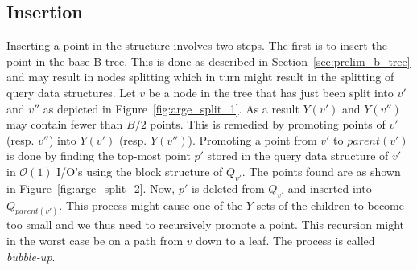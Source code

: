 \documentclass[twoside,11pt,openright]{report}
\begin{document}
\subsection{Insertion}
Inserting a point in the structure involves two steps. The first is to insert the point in the base B-tree. This is done as described in Section~\ref{sec:prelim_b_tree} and may result in nodes splitting which in turn might result in the splitting of query data structures. Let $v$ be a node in the tree that has just been split into $v'$ and $v''$ as depicted in Figure~\ref{fig:arge_split_1}. As a result $Y(v')$ and $Y(v'')$ may contain fewer than $B/2$ points. This is remedied by promoting points of $v'$ (resp. $v''$) into $Y(v')$ (resp. $Y(v'')$). Promoting a point from $v'$ to $parent(v')$ is done by finding the top-most point $p'$ stored in the query data structure of $v'$ in $\mathcal{O}(1)$ I/O's using the block structure of $Q_{v'}$. The points found are as shown in Figure~\ref{fig:arge_split_2}. Now, $p'$ is deleted from $Q_{v'}$ and inserted into $Q_{parent(v')}$. This process might cause one of the $Y$ sets of the children to become too small and we thus need to recursively promote a point. This recursion might in the worst case be on a path from $v$ down to a leaf. The process is called \textit{bubble-up}.
\end{document}

